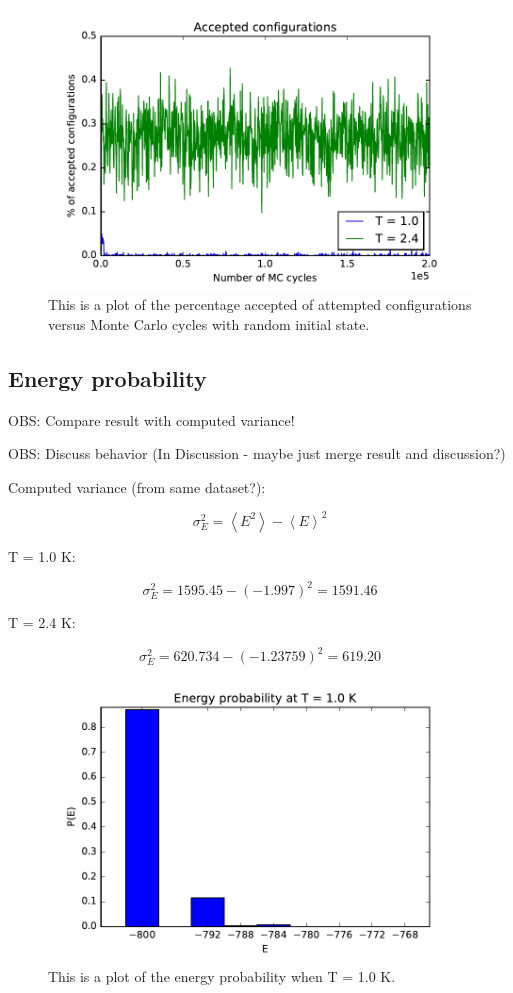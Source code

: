 \begin{figure}[H]
\includegraphics[width=\linewidth]{../results/4c/L_20_accepted_configs}\caption{This is a plot of the percentage accepted of attempted configurations versus  Monte Carlo cycles with random initial state.}\label{fig:percentage_accepted}
\end{figure}

\subsection{Energy probability}

OBS: Compare result with computed variance!

OBS: Discuss behavior (In Discussion - maybe just merge result and discussion?)

Computed variance (from same dataset?):

$$ \sigma_E^2 = \left< E^2\right> - \left< E\right>^2 $$

T = 1.0 K:

$$ \sigma_E^2 = 1595.45 - (-1.997)^2 = 1591.46$$

T = 2.4 K:

$$ \sigma_E^2 =   620.734 - (-1.23759)^2
 = 619.20$$

\begin{figure}[H]
\includegraphics[width=\linewidth]{../results/4d/d_T_1probability}\caption{This is a plot of the energy probability when T = 1.0 K.}\label{fig:probability_T_1.0}
\end{figure}

